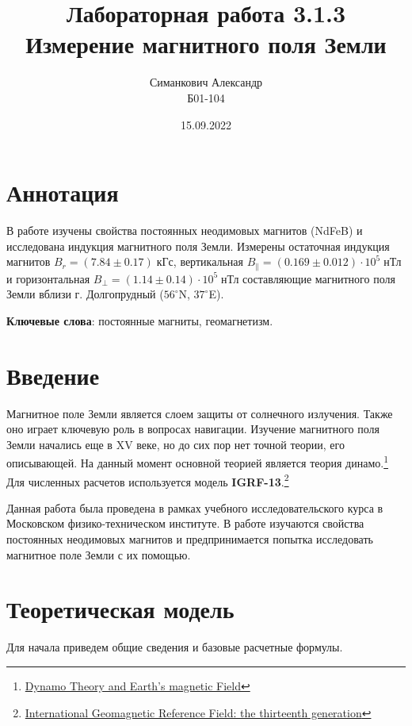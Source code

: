 \documentclass[12pt,a4paper]{article}
\title{Лабораторная работа 3.1.3\\ Измерение магнитного поля Земли}
\author{Симанкович Александр \\ Б01-104}
\date{15.09.2022}
\begin{document}
	\maketitle
	
	\section*{Аннотация}
	
	В работе изучены свойства постоянных неодимовых магнитов (NdFeB) и исследована индукция магнитного поля Земли. Измерены остаточная индукция магнитов $B_r = (7.84 \pm 0.17) \; \text{кГс}$, вертикальная  $B_\parallel = (0.169 \pm 0.012) \cdot 10^5 \; \text{нТл}$ и горизонтальная $ B_{\perp} = (1.14 \pm 0.14) \cdot 10^5 \; \text{нТл}$ составляющие магнитного поля Земли вблизи г. Долгопрудный ($56^\circ$N, $37 ^\circ$E).
	
	\vspace{10pt}
	\noindent\textbf{Ключевые слова}: постоянные магниты, геомагнетизм.
	
	\section*{Введение}
	
	Магнитное поле Земли является слоем защиты от солнечного излучения. Также оно играет ключевую роль в вопросах навигации. Изучение магнитного поля Земли начались еще в XV веке, но до сих пор нет точной теории, его описывающей. На данный момент основной теорией является теория динамо.\footnote{
		\href{https://web.archive.org/web/20070221094040/http://setiathome.berkeley.edu/~pauld/etc/210BPaper.pdf}{Dynamo Theory and Earth's magnetic Field}
	}
	Для численных расчетов используется модель \textbf{IGRF-13}.\footnote{
		\href{https://earth-planets-space.springeropen.com/articles/10.1186/s40623-020-01288-x}
		{International Geomagnetic Reference Field: the thirteenth generation}
	}

	Данная работа была проведена в рамках учебного исследовательского курса в Московском физико-техническом институте. В работе изучаются свойства постоянных неодимовых магнитов и предпринимается попытка исследовать магнитное поле Земли с их помощью.
	
	\section*{Теоретическая модель}
	
	Для начала приведем общие сведения и базовые расчетные формулы.
	
\end{document}
